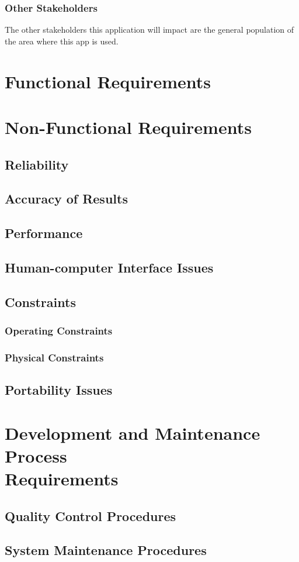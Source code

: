 \documentclass[12pt]{article}
\begin{document}
    \subsubsection{Other Stakeholders}
    The other stakeholders this application will impact are the general population of the area where this app is used.

\section{Functional Requirements}

\section{Non-Functional Requirements}
\subsection{Reliability}

\subsection{Accuracy of Results}

\subsection{Performance}

\subsection{Human-computer Interface Issues}

\subsection{Constraints}
    \subsubsection{Operating Constraints}
    
    \subsubsection{Physical Constraints}
    
\subsection{Portability Issues}
\section{\texorpdfstring{Development and Maintenance Process \\Requirements}{Development and Maintenance Process Requirements}}

\subsection{Quality Control Procedures}

\subsection{System Maintenance Procedures}
\end{document}
